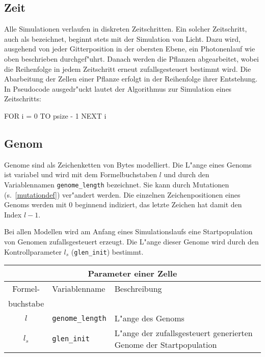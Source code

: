 \subsection{Zeit}
\label{timedef}

Alle Simulationen verlaufen in diskreten Zeitschritten. Ein solcher Zeitschritt,
auch als  bezeichnet, beginnt stets mit der Simulation von Licht. Dazu wird,
ausgehend von jeder Gitterposition in der obersten Ebene, ein Photonenlauf
wie oben beschrieben durchgef"uhrt. Danach werden die Pflanzen abgearbeitet,
wobei die Reihenfolge in jedem Zeitschritt erneut zufallsgesteuert bestimmt
wird. Die Abarbeitung der Zellen einer Pflanze erfolgt in der Reihenfolge
ihrer Entstehung. In Pseudocode ausgedr"uckt lautet der Algorithmus zur
Simulation eines Zeitschritts:

\begin{verbatimcmd}
FOR i = 0 TO psize - 1
NEXT i
\end{verbatimcmd}


\subsection{Genom}
\label{genomedef}

Genome sind als Zeichenketten von Bytes
modelliert. Die L"ange eines Genoms ist variabel und wird mit
dem Formelbuchstaben $l$ und durch den Variablennamen \verb|genome_length|
bezeichnet. Sie kann durch Mutationen
(s.\ \ref{mutationdef}) ver"andert werden. Die einzelnen
Zeichenpositionen eines Genoms werden mit 0 beginnend indiziert,
das letzte Zeichen hat damit den Index $l - 1$.

Bei allen Modellen wird am Anfang eines Simulationslaufs eine Startpopulation
von Genomen zufallsgesteuert erzeugt. Die L"ange dieser Genome wird durch den
Kontrollparameter $l_s$ (\verb|glen_init|) bestimmt.

\medskip
\noindent\begin{tabularx}{\linewidth}{|c|l|X|} \hline
\multicolumn{3}{|c|}{\bfseries Parameter einer Zelle} \\ \hline
Formel- & Variablenname   & Beschreibung \\
buchstabe &               & \\ \hline
$l$       & \verb|genome_length| & L"ange des Genoms \\
$l_s$     & \verb|glen_init| & L"ange der zufallsgesteuert generierten Genome der Startpopulation \\ \hline
\end{tabularx}
\medskip


